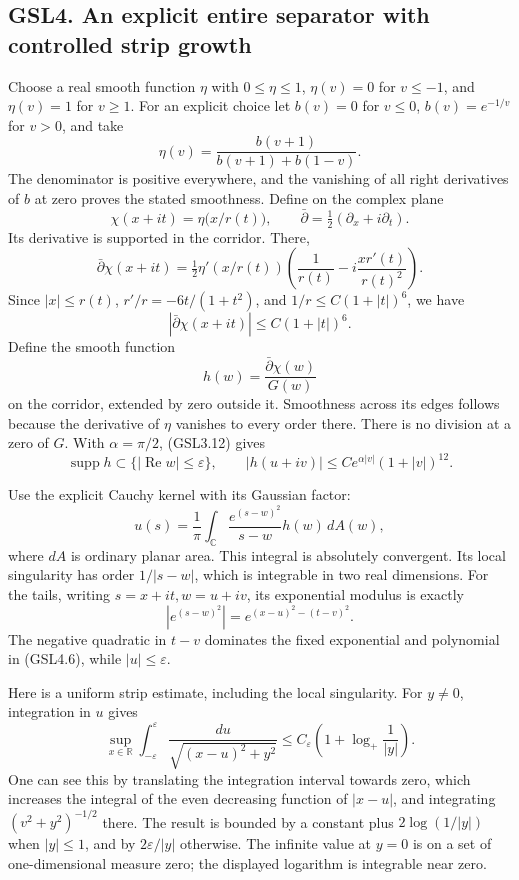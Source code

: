 \subsection{GSL4. An explicit entire separator with controlled strip
growth}\label{gsl4.-an-explicit-entire-separator-with-controlled-strip-growth}

Choose a real smooth function \(\eta\) with \(0\le\eta\le1\),
\(\eta(v)=0\) for \(v\le-1\), and \(\eta(v)=1\) for \(v\ge1\). For an
explicit choice let \(b(v)=0\) for \(v\le0\), \(b(v)=e^{-1/v}\) for
\(v>0\), and take \[
\eta(v)=\frac{b(v+1)}{b(v+1)+b(1-v)}.
\tag{GSL4.1}
\] The denominator is positive everywhere, and the vanishing of all
right derivatives of \(b\) at zero proves the stated smoothness. Define
on the complex plane \[
\chi(x+it)=\eta\bigl(x/r(t)\bigr),\qquad
\bar\partial=\tfrac12(\partial_x+i\partial_t).
\tag{GSL4.2}
\] Its derivative is supported in the corridor. There, \[
\bar\partial\chi(x+it)
 =\tfrac12\eta'(x/r(t))
 \left(\frac1{r(t)}-i\frac{x r'(t)}{r(t)^2}\right).
\tag{GSL4.3}
\] Since \(|x|\le r(t)\), \(r'/r=-6t/(1+t^2)\), and
\(1/r\le C(1+|t|)^6\), we have \[
|\bar\partial\chi(x+it)|\le C(1+|t|)^6.
\tag{GSL4.4}
\] Define the smooth function \[
h(w)=\frac{\bar\partial\chi(w)}{G(w)}
\tag{GSL4.5}
\] on the corridor, extended by zero outside it. Smoothness across its
edges follows because the derivative of \(\eta\) vanishes to every order
there. There is no division at a zero of \(G\). With \(\alpha=\pi/2\),
(GSL3.12) gives \[
\operatorname{supp}h\subset\{|\operatorname{Re}w|\le\varepsilon\},\qquad
|h(u+iv)|\le C e^{\alpha|v|}(1+|v|)^{12}.
\tag{GSL4.6}
\]

Use the explicit Cauchy kernel with its Gaussian factor: \[
u(s)=\frac1\pi\int_{\mathbb C}
 \frac{e^{(s-w)^2}}{s-w}h(w)\,dA(w),
\tag{GSL4.7}
\] where \(dA\) is ordinary planar area. This integral is absolutely
convergent. Its local singularity has order \(1/|s-w|\), which is
integrable in two real dimensions. For the tails, writing
\(s=x+it,w=u+iv\), its exponential modulus is exactly \[
|e^{(s-w)^2}|=e^{(x-u)^2-(t-v)^2}.
\tag{GSL4.8}
\] The negative quadratic in \(t-v\) dominates the fixed exponential and
polynomial in (GSL4.6), while \(|u|\le\varepsilon\).

Here is a uniform strip estimate, including the local singularity. For
\(y\ne0\), integration in \(u\) gives \[
\sup_{x\in\mathbb R}\int_{-\varepsilon}^{\varepsilon}
 \frac{du}{\sqrt{(x-u)^2+y^2}}
 \le C_\varepsilon\left(1+\log_+\frac1{|y|}\right).
\tag{GSL4.9}
\] One can see this by translating the integration interval towards
zero, which increases the integral of the even decreasing function of
\(|x-u|\), and integrating \((v^2+y^2)^{-1/2}\) there. The result is
bounded by a constant plus \(2\log(1/|y|)\) when \(|y|\le1\), and by
\(2\varepsilon/|y|\) otherwise. The infinite value at \(y=0\) is on a
set of one-dimensional measure zero; the displayed logarithm is
integrable near zero.

